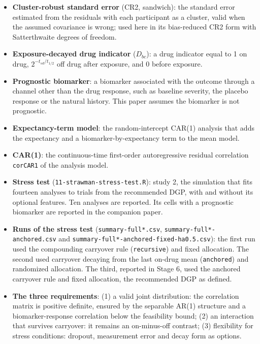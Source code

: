 \documentclass[
  11pt,
]{article}
\begin{document}
\begin{itemize}
  error computed as if the analysis model's assumed covariance of each
  participant's outcomes were the true one. Correct only when that
  covariance is right.
\item
  \textbf{Cluster-robust standard error} (CR2, sandwich): the standard
  error estimated from the residuals with each participant as a
  cluster, valid when the assumed covariance is wrong; used here in its
  bias-reduced CR2 form with Satterthwaite degrees of freedom.
\item
  \textbf{Exposure-decayed drug indicator} (\(D_{bc}\)): a drug indicator
  equal to 1 on drug, \(2^{-t_{sd}/t_{1/2}}\) off drug after exposure,
  and 0 before exposure.
\item
  \textbf{Prognostic biomarker}: a biomarker associated with the outcome
  through a channel other than the drug response, such as baseline
  severity, the placebo response or the natural history. This paper
  assumes the biomarker is not prognostic.
\item
  \textbf{Expectancy-term model}: the random-intercept CAR(1) analysis that
  adds the expectancy and a biomarker-by-expectancy term to the mean
  model.
\item
  \textbf{CAR(1)}: the continuous-time first-order autoregressive residual
  correlation \texttt{corCAR1} of the analysis model.
\item
  \textbf{Stress test} (\texttt{11-strawman-stress-test.R}): study 2, the
  simulation that fits fourteen analyses to trials from the recommended
  DGP, with and without its optional features. Ten analyses are
  reported. Its cells with a prognostic biomarker are reported in the
  companion paper.
\item
  \textbf{Runs of the stress test} (\texttt{summary-full*.csv},
  \texttt{summary-full*-anchored.csv} and
  \texttt{summary-full*-anchored-fixed-ha0.5.csv}): the first run used the
  compounding carryover rule (\texttt{recursive}) and fixed allocation. The
  second used carryover decaying from the last on-drug mean
  (\texttt{anchored}) and randomized allocation. The third, reported in
  Stage 6, used the anchored carryover rule and fixed allocation, the
  recommended DGP as defined.
\item
  \textbf{The three requirements}: (1) a valid joint distribution: the
  correlation matrix is positive definite, ensured by the separable
  AR(1) structure and a biomarker-response correlation below the
  feasibility bound; (2) an interaction that survives carryover: it
  remains an on-minus-off contrast; (3) flexibility for stress
  conditions: dropout, measurement error and decay form as options.
\end{itemize}
\end{document}
